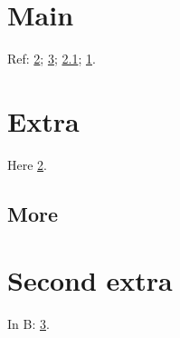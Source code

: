 \documentclass{report}
\begin{document}
\chapter{Main}\label{main}
Ref: \ref{app:a}; \ref{app:b}; \ref{sec:a}; \ref{main}.
\appendix
\renewcommand\thechapter{\Roman{chapter}}
\chapter{Extra}\label{app:a}
Here \ref{app:a}.
\section{More}\label{sec:a}
\chapter{Second extra}\label{app:b}
In B: \ref{app:b}.
\end{document}
